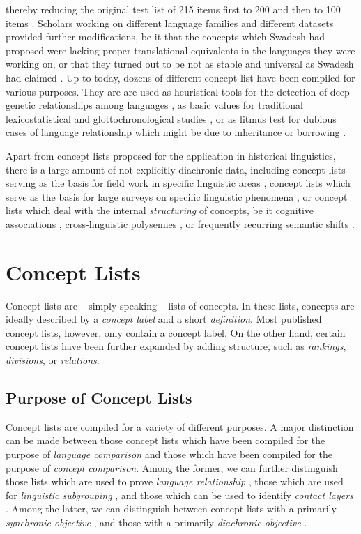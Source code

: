 \documentclass[10pt, a4paper]{article}
\begin{document}
thereby reducing the original test list of 215 items first to 200 \cite{Swadesh1952} and then to 100
items \cite{Swadesh1955}. Scholars working on different language families and different datasets
provided further modifications, be it that the concepts which Swadesh had proposed were lacking
proper translational equivalents in the languages they were working on, or that they
turned out to be not as stable and universal as Swadesh had claimed \cite{Matisoff1978,Alpher1999}. 
Up to today, dozens of different concept list have been compiled for various purposes.
They are are used as heuristical tools for the detection of deep genetic
relationships among languages \cite{Dolgopolsky1964}, 
as basic values for traditional
lexicostatistical and glottochronological studies \cite{Dyen1992,Starostin1991}, 
or as litmus test
for dubious cases of language relationship which might be due to inheritance or borrowing 
\cite{McMahon2005b,Chen1996,Wang2006}. 
 
Apart from concept lists proposed for the application in historical linguistics, there is
a large amount of not explicitly diachronic data, including concept lists serving as the
basis for field work in specific linguistic areas \cite{Kraft1981}, concept lists which serve as the
basis for large surveys on specific linguistic phenomena \cite{Wold2009}, or concept lists which deal with
the internal \emph{structuring} of concepts, be it cognitive associations \cite{Nelson2004},
cross-linguistic polysemies \cite{List2014f}, or frequently recurring semantic shifts
\cite{Bulakh2013}.


\section{Concept Lists}
\noindent Concept lists are -- simply speaking -- lists of concepts. In these lists, concepts are ideally
described by a \emph{concept label} and a short \emph{definition}. Most published
concept lists, however, only contain a concept label. On the other hand, certain concept lists have
been further expanded by
adding structure, such as \emph{rankings}, \emph{divisions}, or \emph{relations}.

\subsection{Purpose of Concept Lists}
\noindent Concept lists are compiled for a variety of different
purposes. A major distinction can be made between those concept lists which have been compiled for
the
purpose of \emph{language comparison} and those which have been compiled for the purpose of \emph{concept
comparison}. 
Among the former, we can further distinguish those lists which are used to prove \emph{language
relationship} \cite{Dolgopolsky1964}, those which are used for \emph{linguistic subgrouping}
\cite{Norman2003,Starostin1991,Swadesh1955}, and those which can be used to identify \emph{contact
layers} \cite{Chen1996}. Among the latter, we can distinguish between concept lists with a primarily
\emph{synchronic objective} \cite{Hill2014}, and those with a primarily \emph{diachronic objective}
\cite{Wold2009,Bulakh2013}.
\end{document}

